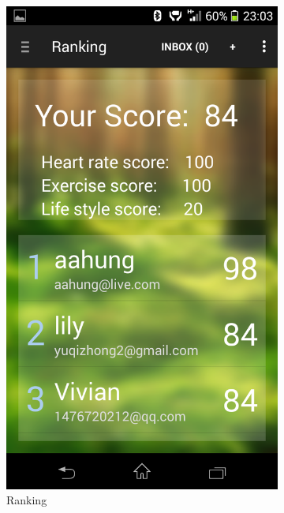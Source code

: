 \begin{figure}
\begin{subfigure}{.24\textwidth}
  \includegraphics[width=.8\linewidth]{img/screenshot/ss8.png}
  \caption{Ranking}
\end{subfigure}%
\begin{subfigure}{.24\textwidth}
  \centering

\end{subfigure}
\end{figure}
